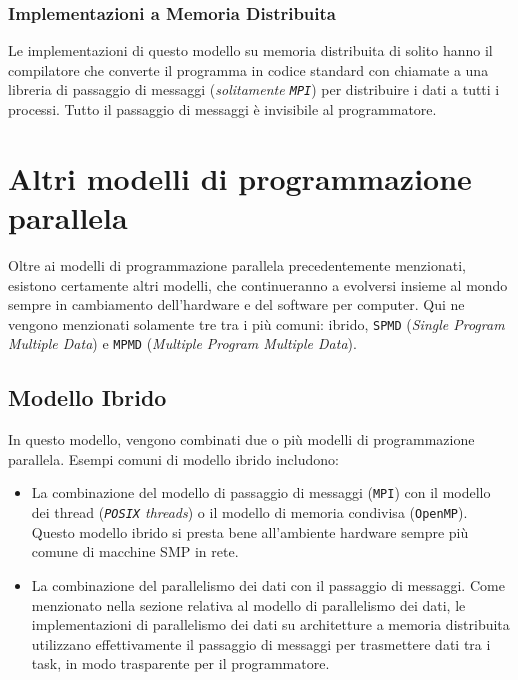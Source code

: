 \subsubsection{Implementazioni a Memoria Distribuita}
Le implementazioni di questo modello su memoria
distribuita di solito hanno il compilatore che converte
il programma in codice standard con chiamate a una
libreria di passaggio di messaggi (\textit{solitamente \texttt{MPI}})
per distribuire i dati a tutti i processi. Tutto il
passaggio di messaggi è invisibile al programmatore.

\section{Altri modelli di programmazione parallela}
Oltre ai modelli di programmazione parallela
precedentemente menzionati, esistono certamente
altri modelli, che continueranno a evolversi insieme
al mondo sempre in cambiamento dell'hardware e del
software per computer. Qui ne vengono menzionati
solamente tre tra i più comuni: ibrido, \texttt{SPMD}
(\textit{Single Program Multiple Data}) e \texttt{MPMD}
(\textit{Multiple Program Multiple Data}).

\subsection{Modello Ibrido}
In questo modello, vengono combinati due o più modelli
di programmazione parallela. Esempi comuni di modello
ibrido includono:
\begin{itemize}
    \item La combinazione del modello di passaggio di
    messaggi (\texttt{MPI}) con il modello dei thread
    (\textit{\texttt{POSIX} threads}) o il modello di
    memoria condivisa (\texttt{OpenMP}). Questo modello
    ibrido si presta bene all'ambiente hardware sempre
    più comune di macchine SMP in rete.
    \item La combinazione del parallelismo dei dati con
    il passaggio di messaggi. Come menzionato nella
    sezione relativa al modello di parallelismo dei dati,
    le implementazioni di parallelismo dei dati su
    architetture a memoria distribuita utilizzano
    effettivamente il passaggio di messaggi per
    trasmettere dati tra i task, in modo trasparente
    per il programmatore.
\end{itemize}

